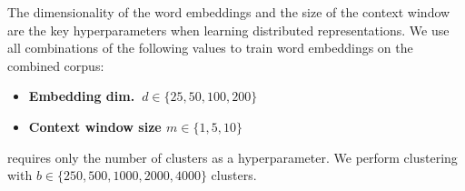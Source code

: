 The dimensionality of the word embeddings and the size of the context
window are the key hyperparameters when learning distributed
representations. We use all combinations of the following values to
train word embeddings on the combined corpus:
\begin{itemize}
\item \textbf{Embedding dim.\ $d \in \{25, 50, 100, 200\}$}
\item \textbf{Context window size $m \in \{1, 5, 10\}$}
\end{itemize}
\brown requires only the number of clusters as a hyperparameter. We
perform clustering with $b \in \{250, 500, 1000, 2000, 4000\}$ clusters.
%
%
%
%
%
% 
%
